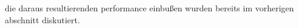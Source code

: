 die daraus resultierenden performance einbußen wurden bereits im vorherigen abschnitt diskutiert.




